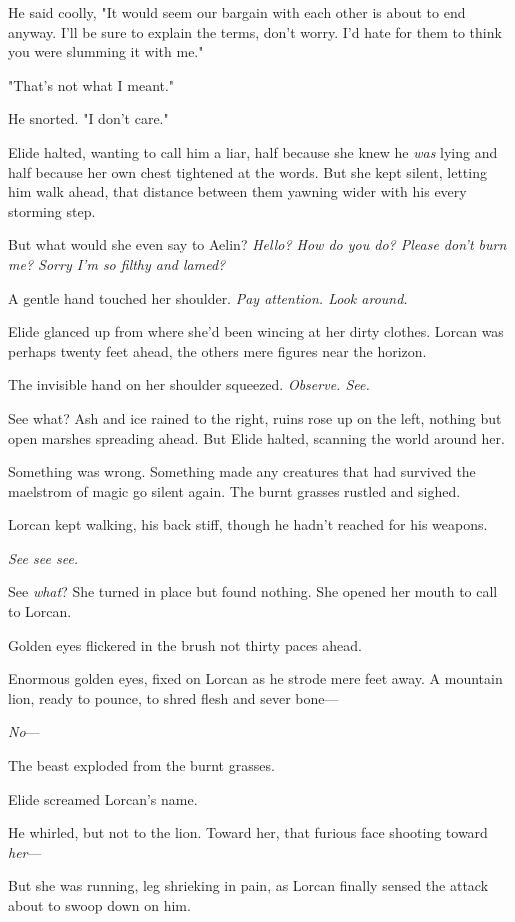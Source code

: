 He said coolly, "It would seem our bargain with each other is about to end anyway.
I'll be sure to explain the terms, don't worry.
I'd hate for them to think you were slumming it with me."

"That's not what I meant."

He snorted.
"I don't care."

Elide halted, wanting to call him a liar, half because she knew he \emph{was} lying and half because her own chest tightened at the words.
But she kept silent, letting him walk ahead, that distance between them yawning wider with his every storming step.

But what would she even say to Aelin?
\emph{Hello?
How do you do?
Please don't burn me?
Sorry I'm so filthy and lamed?}

A gentle hand touched her shoulder.
\emph{Pay attention.
Look around.}

Elide glanced up from where she'd been wincing at her dirty clothes.
Lorcan was perhaps twenty feet ahead, the others mere figures near the horizon.

The invisible hand on her shoulder squeezed.
\emph{Observe.
See.}

See what?
Ash and ice rained to the right, ruins rose up on the left, nothing but open marshes spreading ahead.
But Elide halted, scanning the world around her.

Something was wrong.
Something made any creatures that had survived the maelstrom of magic go silent again.
The burnt grasses rustled and sighed.

Lorcan kept walking, his back stiff, though he hadn't reached for his weapons.

\emph{See see see.}

See \emph{what}?
She turned in place but found nothing.
She opened her mouth to call to Lorcan.

Golden eyes flickered in the brush not thirty paces ahead.

Enormous golden eyes, fixed on Lorcan as he strode mere feet away.
A mountain lion, ready to pounce, to shred flesh and sever bone---

\emph{No}---

The beast exploded from the burnt grasses.

Elide screamed Lorcan's name.

He whirled, but not to the lion.
Toward her, that furious face shooting toward \emph{her}---

But she was running, leg shrieking in pain, as Lorcan finally sensed the attack about to swoop down on him.

